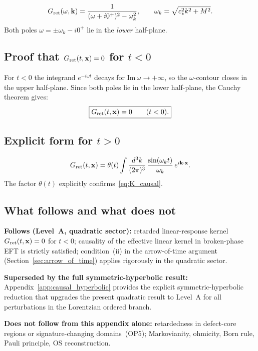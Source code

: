 \documentclass[11pt,a4paper]{article}
\numberwithin{equation}{section}
\begin{document}
\begin{equation}
  \label{eq:Gret_Fourier}
  G_{\rm ret}(\omega,\mathbf{k})
  =\frac{1}{(\omega+i0^+)^2-\omega_k^2},
  \qquad\omega_k=\sqrt{c_*^2k^2+M^2}.
\end{equation}
Both poles $\omega=\pm\omega_k-i0^+$ lie in the \emph{lower} half-plane.

\subsection*{Proof that $G_{\rm ret}(t,\mathbf{x})=0$ for $t<0$}

For $t<0$ the integrand $e^{-i\omega t}$ decays for $\text{Im}\,\omega\to+\infty$,
so the $\omega$-contour closes in the upper half-plane.
Since both poles lie in the lower half-plane, the Cauchy theorem gives:
\begin{equation}
  \label{eq:K_causal}
  \boxed{G_{\rm ret}(t,\mathbf{x})=0\qquad(t<0).}
\end{equation}

\subsection*{Explicit form for $t>0$}

\begin{equation}
  \label{eq:Gret_explicit}
  G_{\rm ret}(t,\mathbf{x})=\theta(t)\int\frac{d^3k}{(2\pi)^3}\,
  \frac{\sin(\omega_k t)}{\omega_k}\,e^{i\mathbf{k}\cdot\mathbf{x}}.
\end{equation}
The factor $\theta(t)$ explicitly confirms~\eqref{eq:K_causal}.

\subsection*{What follows and what does not}

\textbf{Follows (Level~A, quadratic sector):}
retarded linear-response kernel $G_{\rm ret}(t,\mathbf{x})=0$ for $t<0$;
causality of the effective linear kernel in broken-phase EFT is strictly satisfied;
condition~(ii) in the arrow-of-time argument (Section~\ref{sec:arrow_of_time})
applies rigorously in the quadratic sector.

\textbf{Superseded by the full symmetric-hyperbolic result:}
Appendix~\ref{app:causal_hyperbolic} provides the explicit symmetric-hyperbolic
reduction that upgrades the present quadratic result to Level~A for all
perturbations in the Lorentzian ordered branch.

\textbf{Does not follow from this appendix alone:}
retardedness in defect-core regions or signature-changing domains~(OP5);
Markovianity, ohmicity, Born rule, Pauli principle, OS reconstruction.
\end{document}
